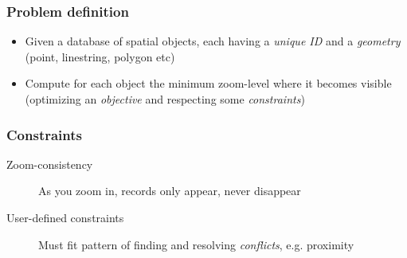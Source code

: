 \documentclass{beamer}
\begin{document}
\frame
{
  \frametitle{Problem definition}
  \begin{itemize}
  \item Given a database of spatial objects, each having a \emph{unique ID} and a \emph{geometry} (point, linestring, polygon etc)
  \item Compute for each object the minimum zoom-level where it becomes visible (optimizing an \emph{objective} and respecting some \emph{constraints})
  \end{itemize}
  \begin{center}
  \end{center}
}

\frame
{
  \frametitle{Constraints}
  \begin{description}
  \item [Zoom-consistency] As you zoom in, records only appear, never disappear~\cite{fusiontables}
  \item [User-defined constraints] Must fit pattern of finding and resolving \emph{conflicts}, e.g. proximity
  \end{description}
  \begin{center}
  \end{center}
}
\end{document}
